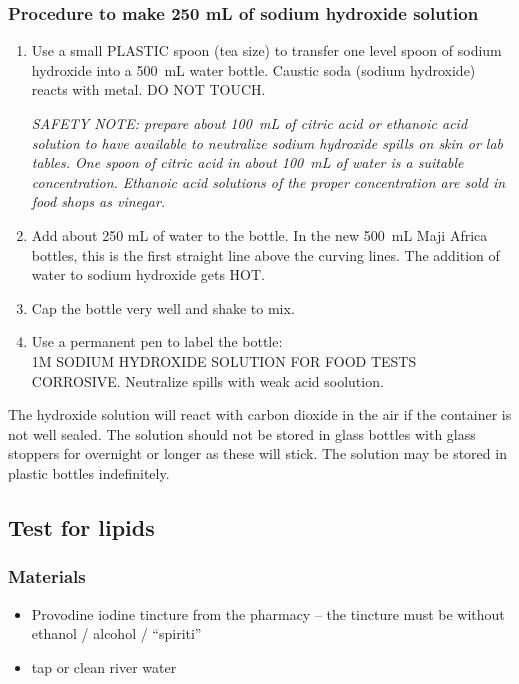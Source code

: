 \subsubsection{Procedure to make 250 mL of sodium hydroxide solution}
\begin{enumerate}
\item{Use a small PLASTIC spoon (tea size) to transfer one level spoon of sodium hydroxide into a 500~mL water bottle. Caustic soda (sodium hydroxide) reacts with metal. DO NOT TOUCH.

\textit{SAFETY NOTE: prepare about 100~mL of citric acid or ethanoic acid solution to have available to neutralize sodium hydroxide spills on skin or lab tables. One spoon of citric acid in about 100~mL of water is a suitable concentration. Ethanoic acid solutions of the proper concentration are sold in food shops as vinegar.}

}%

\item{Add about 250 mL of water to the bottle. In the new 500~mL Maji Africa bottles, this is the first straight line above the curving lines. The addition of water to sodium hydroxide gets HOT.}
\item{Cap the bottle very well and shake to mix.}
\item{Use a permanent pen to label the bottle:\\
1M SODIUM HYDROXIDE SOLUTION FOR FOOD TESTS\\
CORROSIVE. Neutralize spills with weak acid soolution.}
\end{enumerate}

The hydroxide solution will react with carbon dioxide in the air if the container is not well sealed. The solution should not be stored in glass bottles with glass stoppers for overnight or longer as these will stick. The solution may be stored in plastic bottles indefinitely.

\subsection{Test for lipids}

\subsubsection{Materials}
\begin{itemize}
\item{Provodine iodine tincture from the pharmacy -- the tincture must be without ethanol / alcohol / “spiriti”}
\item{tap or clean river water}
\end{itemize}

